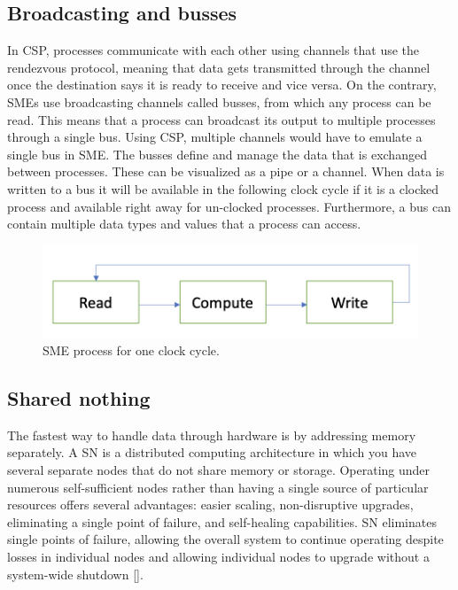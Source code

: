 \subsection{Broadcasting and busses}
In CSP, processes communicate with each other using channels that use the rendezvous protocol, meaning that data gets transmitted through the channel once the destination says it is ready to receive and vice versa.
On the contrary, SMEs use broadcasting channels called busses, from which any process can be read. This means that a process can broadcast its output to multiple processes through a single bus. Using CSP, multiple channels would have to emulate a single bus in SME. The busses define and manage the data that is exchanged between processes. These can be visualized as a pipe or a channel. When data is written to a bus it
will be available in the following clock cycle if it is a clocked process and available right
away for un-clocked processes. Furthermore, a bus can contain multiple data types and values that a process can access. 

\begin{figure}[H]
  \centering
  \includegraphics[width=0.7\linewidth]{Pictures/readbus.png}
  \caption{SME process for one clock cycle.}
  \label{fig:readbus}
\end{figure}


\subsection{Shared nothing}
The fastest way to handle data through hardware is by addressing memory separately.
A \acrshort{SN} is a distributed computing architecture in which you have several separate nodes that do not share memory or storage.
Operating under numerous self-sufficient nodes rather than having a single source of particular resources offers several advantages: easier scaling, non-disruptive upgrades, eliminating a single point of failure, and self-healing capabilities.
SN eliminates single points of failure, allowing the overall system to continue operating despite losses in individual nodes and allowing individual nodes to upgrade without a system-wide shutdown [\cite{sharednothing}]. 

\newpage


